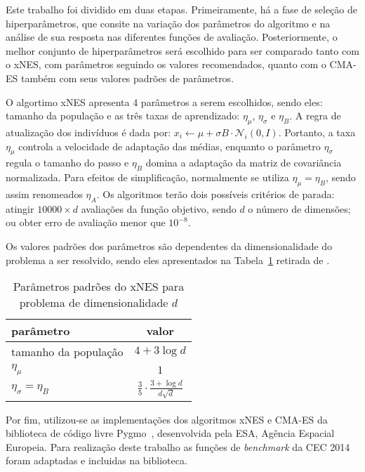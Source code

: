 Este trabalho foi dividido em duas etapas.
Primeiramente, há a fase de seleção de hiperparâmetros, que consite na variação dos parâmetros do algoritmo e na análise de
sua resposta nas diferentes funções de avaliação.
Posteriormente, o melhor conjunto de hiperparâmetros será escolhido para ser comparado tanto com o xNES, com parâmetros
seguindo os valores recomendados, quanto com o CMA-ES também com seus valores padrões de parâmetros.

O algortimo xNES apresenta 4 parâmetros a serem escolhidos, sendo eles: tamanho da população e as três taxas de aprendizado:
$\eta_{\mu}$, $\eta_{\sigma}$ e $\eta_{B}$.
A regra de atualização dos indivíduos é dada por: $x_i \leftarrow \mu + \sigma B \cdot \mathcal{N}_i(0, I)$.
Portanto, a taxa $\eta_{\mu}$ controla a velocidade de adaptação das médias, enquanto o parâmetro $\eta_{\sigma}$ regula o tamanho
do passo e $\eta_{B}$ domina a adaptação da matriz de covariância normalizada.
Para efeitos de simplificação, normalmente se utiliza $\eta_{\mu} = \eta_B$, sendo assim renomeados $\eta_A$.
Os algoritmos terão dois possíveis critérios de parada: atingir $10000 \times d$ avaliações da função objetivo, sendo $d$
o número de dimensões; ou obter erro de avaliação menor que $10^{-8}$.

Os valores padrões dos parâmetros são dependentes da dimensionalidade do problema a ser resolvido, sendo eles apresentados
na Tabela~\ref{tab:xnes_default} retirada de \cite{glasmachers10}.

\begin{table}[!t]
\renewcommand{\arraystretch}{1.3}
\caption{Parâmetros padrões do xNES para problema de dimensionalidade $d$}
\label{tab:xnes_default}
\centering
\begin{tabular}{|l|c|}
\hline
\bfseries parâmetro & \bfseries valor\\
\hline
tamanho da população & $4 + 3 \log d$\\
$\eta_{\mu}$ & $1$\\
$\eta_{\sigma} = \eta_B$ & $\frac{3}{5} \cdot \frac{3 + \log d}{d \sqrt{d}}$\\
\hline
\end{tabular}
\end{table}

Por fim, utilizou-se as implementações dos algoritmos xNES e CMA-ES da biblioteca de código livre Pygmo~\cite{pygmo},
desenvolvida pela ESA, Agência Espacial Europeia.
Para realização deste trabalho as funções de \textit{benchmark} da CEC 2014 foram adaptadas e incluidas na biblioteca.
